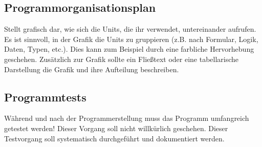 \documentclass[12pt, letterpaper, twoside]{article}
\begin{document}
        \subsection{Programmorganisationsplan}
            Stellt grafisch dar, wie sich die Units, die ihr verwendet, untereinander aufrufen. Es ist sinnvoll, in der Grafik die Units zu gruppieren (z.B. nach Formular, Logik, Daten, Typen, etc.). Dies kann zum Beispiel durch eine farbliche Hervorhebung geschehen. Zusätzlich zur Grafik sollte ein Fließtext oder eine tabellarische Darstellung die Grafik und ihre Aufteilung beschreiben.
            
        \subsection{Programmtests}
            Während und nach der Programmerstellung muss das Programm umfangreich getestet werden! Dieser Vorgang soll nicht willkürlich geschehen. Dieser Testvorgang soll systematisch durchgeführt und dokumentiert werden.
\end{document}
